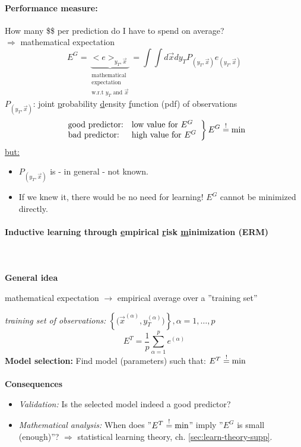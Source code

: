 \paragraph{Performance measure:}
How many \$\$ per prediction do I have to spend on average?\\
\indent $\Rightarrow$ mathematical expectation
\begin{equation} \tag{generalization error}
	E^G = \underbrace{<e>_{y_T, \vec{x}}}_{ 
		\substack{\text{mathematical} \\ \text{expectation} \\
			\text{w.r.t } y_T \text{ and } \vec{x}}}
	= \int \int d \vec{x} d y_T P_{(y_T, \vec{x})} e_{(y_T, \vec{x})}
\end{equation}
$P_{(y_T, \vec{x})}$: joint \underline{p}robability \underline{d}ensity \underline{f}unction (pdf) of observations
\[ \left. \begin{array}{ll}
	\text{good predictor:} & \text{low value for } E^G \\
	\text{bad predictor:} & \text{high value for } E^G
\end{array} \right \} E^G \stackrel{\mathrm{!}}{=} \min \]
\underline{but:}
\begin{itemize}
\item $P_{(y_T, \vec{x})}$ is - in general - not known.
\item If we knew it, there would be no need for learning!
\itr $E^G$ cannot be minimized directly.
\end{itemize}

\paragraph{Inductive learning through \underline{e}mpirical \underline{r}isk \underline{m}inimization (ERM)}\mbox{}\\\\
\textbf{General idea}
\begin{center}
mathematical expectation $\rightarrow$ empirical average over a ''training set''
\end{center}

\emph{training set of observations:} $\left\{ \Big(\vec{x}^{(\alpha)}, y_T^{(\alpha)} \Big) \right\}, \alpha = 1, \ldots, p$
\begin{equation} \tag{training error, empirical risk $E^T$}
	E^T = \frac{1}{p} \sum_{\alpha = 1}^p e^{(\alpha)}
\end{equation}
\textbf{Model selection:} Find model (parameters) such that: $E^T \stackrel{\mathrm{!}}{=} \min$
\\\\
{\bf Consequences}
\begin{itemize}
\item \emph{Validation:} Is the selected model indeed a good predictor?
\item \emph{Mathematical analysis:} When does ''$E^T \stackrel{\mathrm{!}}{=} \min$'' imply ''$E^G$ is small (enough)''? $\Rightarrow$ statistical learning theory, ch. \ref{sec:learn-theory-supp}. 

\end{itemize}


